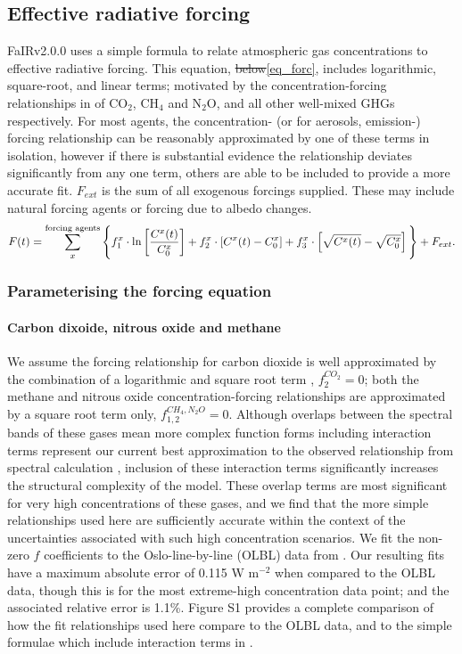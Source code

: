 \documentclass[gmd, manuscript]{copernicus}
\providecommand{\DIFadd}[1]{{\protect\color{blue}#1}} %
\providecommand{\DIFdel}[1]{{\protect\color{red}\sout{#1}}}                      %
\providecommand{\DIFaddbegin}{} %
\providecommand{\DIFaddend}{} %
\providecommand{\DIFdelbegin}{} %
\providecommand{\DIFdelend}{} %
\begin{document}
\subsection{Effective radiative forcing} \label{forcing_relations}
FaIRv2.0\DIFaddbegin \DIFadd{.0 }\DIFaddend uses a simple formula to relate atmospheric gas concentrations to effective radiative forcing. This equation, \DIFdelbegin \DIFdel{below}\DIFdelend \DIFaddbegin \DIFadd{\ref{eq_forc}}\DIFaddend , includes logarithmic, square-root, and linear terms; motivated by the concentration-forcing relationships in \cite{Myhre2013a} of CO$_2$, CH$_4$ and N$_2$O, and all other well-mixed GHGs respectively. For most agents, the concentration- (or for aerosols, emission-) forcing relationship can be reasonably approximated by one of these terms in isolation, however if there is substantial evidence the relationship deviates significantly from any one term, others are able to be included to provide a more accurate fit. $F_{ext}$ is the sum of all exogenous forcings supplied. These may include natural forcing agents or forcing due to albedo changes.
\begin{equation}
    F(t) = \sum_x^{\text{forcing agents}} \Bigg\{ f_1^x \cdot \text{ln}\left[\frac{C^x(t)}{C_0^x}\right] + f_2^x \cdot [C^x(t) - C_0^x] + f_3^x \cdot\left[\sqrt{C^x(t)} - \sqrt{C_0^x}\right] \Bigg\} + F_{ext}. \label{eq_forc}\\
\end{equation}
\subsubsection{Parameterising the forcing equation} \label{forcing_parameters}
\paragraph*{Carbon dixoide, nitrous oxide and methane}
We assume the forcing relationship for carbon dioxide is well approximated by the combination of a logarithmic and square root term \citep{Ramaswamy2001}, $f_2^{CO_2}=0$; both the methane and nitrous oxide concentration-forcing relationships are approximated by a square root term only, $f_{1,2}^{CH_4,N_2O}=0$. Although overlaps between the spectral bands of these gases mean more complex function forms including interaction terms represent our current best approximation to the observed relationship from spectral calculation \citep{Etminan2016}, inclusion of these interaction terms significantly increases the structural complexity of the model. These overlap terms are most significant for very high concentrations of these gases, and we find that the more simple relationships used here are sufficiently accurate within the context of the uncertainties associated with such high concentration scenarios. We fit the non-zero $f$ coefficients to the Oslo-line-by-line (OLBL) data from \cite{Etminan2016}. Our resulting fits have a maximum absolute error of 0.115 W m$^{-2}$ when compared to the OLBL data, though this is for the most extreme-high concentration data point; and the associated relative error is 1.1\%. Figure S1 provides a complete comparison of how the fit relationships used here compare to the OLBL data, and to the simple formulae which include interaction terms in \cite{Etminan2016}. 
\end{document}
